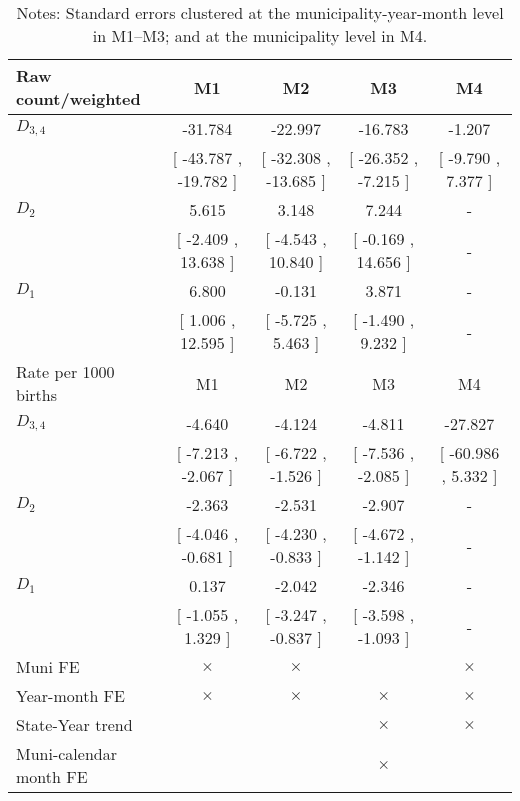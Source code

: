 \begin{table}[!ht]
\centering
\caption{Effects of Drought on anyprenat}\label{tab:twfe_anyprenat}
\fontsize{10pt}{12pt}\selectfont
\begin{tabular}{lcccc}
\toprule
  Raw count/weighted &\multicolumn{1}{c}{M1}&\multicolumn{1}{c}{M2}&\multicolumn{1}{c}{M3}&\multicolumn{1}{c}{M4} \\
\midrule
 $ D_{3,4} $ &   -31.784 &   -22.997 &   -16.783 &    -1.207 \\ 
 & [   -43.787 ,   -19.782 ] & [   -32.308 ,   -13.685 ] & [   -26.352 ,    -7.215 ] & [    -9.790 ,     7.377 ] \\ 
\addlinespace
 $ D_2 $ &     5.615 &     3.148 &     7.244 & - \\ 
 & [    -2.409 ,    13.638 ] & [    -4.543 ,    10.840 ] & [    -0.169 ,    14.656 ] & - \\ 
\addlinespace
 $ D_1 $ &     6.800 &    -0.131 &     3.871 & - \\ 
 & [     1.006 ,    12.595 ] & [    -5.725 ,     5.463 ] & [    -1.490 ,     9.232 ] & - \\ 
\addlinespace
\midrule
  Rate per 1000 births &\multicolumn{1}{c}{M1}&\multicolumn{1}{c}{M2}&\multicolumn{1}{c}{M3}&\multicolumn{1}{c}{M4} \\
\midrule
 $ D_{3,4} $ &    -4.640 &    -4.124 &    -4.811 &   -27.827 \\ 
 & [    -7.213 ,    -2.067 ] & [    -6.722 ,    -1.526 ] & [    -7.536 ,    -2.085 ] & [   -60.986 ,     5.332 ] \\ 
\addlinespace
 $ D_2 $ &    -2.363 &    -2.531 &    -2.907 & - \\ 
 & [    -4.046 ,    -0.681 ] & [    -4.230 ,    -0.833 ] & [    -4.672 ,    -1.142 ] & - \\ 
\addlinespace
 $ D_1 $ &     0.137 &    -2.042 &    -2.346 & - \\ 
 & [    -1.055 ,     1.329 ] & [    -3.247 ,    -0.837 ] & [    -3.598 ,    -1.093 ] & - \\ 
\midrule
  Muni FE & $ \times $ & $ \times $ &  & $ \times $  \\
  Year-month FE & $ \times $ & $ \times $ & $ \times $ & $ \times $ \\
  State-Year trend &  &  & $ \times $ & $ \times $ \\
  Muni-calendar month FE &  &  & $ \times $ & \\
\bottomrule
\end{tabular}
\caption*{\footnotesize{Notes: Standard errors clustered at the municipality-year-month level in M1--M3; and at the municipality level in M4.}}
\end{table}
